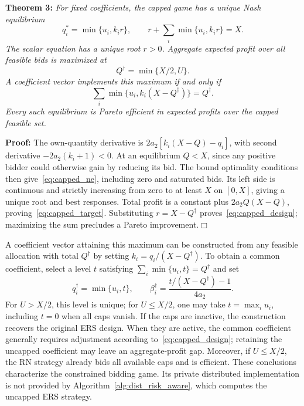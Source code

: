 \documentclass[journal]{IEEEtran}
\begin{document}
\noindent\textbf{Theorem 3:} \textit{For fixed coefficients, the capped game has a unique Nash equilibrium
\begin{equation}
 q_i^*=\min\{u_i,k_i r\},\qquad
 r+\sum_i\min\{u_i,k_i r\}=X. \label{eq:capped_ne}
\end{equation}
The scalar equation has a unique root $r>0$. Aggregate expected profit over all feasible bids is maximized at
\begin{equation}
 Q^\dagger=\min\{X/2,U\}. \label{eq:capped_target}
\end{equation}
A coefficient vector implements this maximum if and only if
\begin{equation}
 \sum_i\min\{u_i,k_i(X-Q^\dagger)\}=Q^\dagger.
 \label{eq:capped_design}
\end{equation}
Every such equilibrium is Pareto efficient in expected profits over the capped feasible set.}

\noindent\textbf{Proof:} The own-quantity derivative is $2a_2[k_i(X-Q)-q_i]$, with second derivative $-2a_2(k_i+1)<0$. At an equilibrium $Q<X$, since any positive bidder could otherwise gain by reducing its bid. The bound optimality conditions then give~\eqref{eq:capped_ne}, including zero and saturated bids. Its left side is continuous and strictly increasing from zero to at least $X$ on $[0,X]$, giving a unique root and best responses. Total profit is a constant plus $2a_2Q(X-Q)$, proving~\eqref{eq:capped_target}. Substituting $r=X-Q^\dagger$ proves~\eqref{eq:capped_design}; maximizing the sum precludes a Pareto improvement.\hfill$\Box$

A coefficient vector attaining this maximum can be constructed from any feasible allocation with total $Q^\dagger$ by setting $k_i=q_i/(X-Q^\dagger)$. To obtain a common coefficient, select a level $t$ satisfying $\sum_i\min\{u_i,t\}=Q^\dagger$ and set
\begin{equation}
 q_i^\dagger=\min\{u_i,t\},\qquad
 \beta_i^\dagger=\frac{t/(X-Q^\dagger)-1}{4a_2}.
 \label{eq:capped_common}
\end{equation}
For $U> X/2$, this level is unique; for $U\leq X/2$, one may take $t=\max_i u_i$, including $t=0$ when all caps vanish. If the caps are inactive, the construction recovers the original ERS design. When they are active, the common coefficient generally requires adjustment according to~\eqref{eq:capped_design}; retaining the uncapped coefficient may leave an aggregate-profit gap. Moreover, if $U\leq X/2$, the RN strategy already bids all available caps and is efficient. These conclusions characterize the constrained bidding game. Its private distributed implementation is not provided by Algorithm~\ref{alg:dist_risk_aware}, which computes the uncapped ERS strategy.
\end{document}
